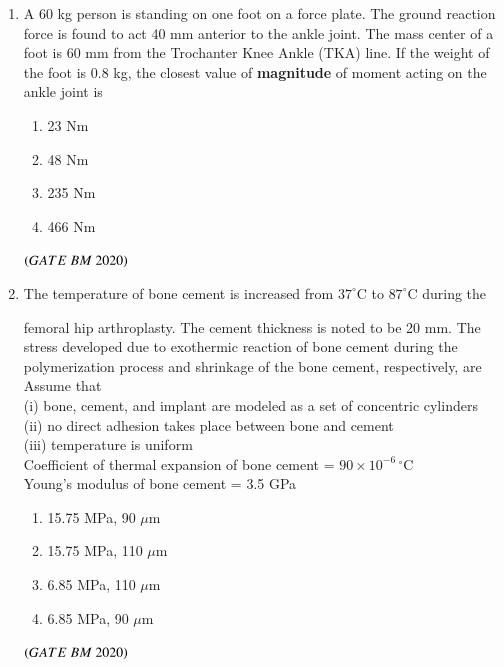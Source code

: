\documentclass[journal,12pt,onecolumn]{IEEEtran}
\theoremstyle{remark}
\begin{document}
\begin{enumerate}
\item A 60 kg person is standing on one foot on a force plate. The ground reaction
force is found to act 40 mm anterior to the ankle joint. The mass center of a foot
is 60 mm from the Trochanter Knee Ankle (TKA) line. If the weight of the foot
is 0.8 kg, the closest value of \textbf{magnitude} of moment acting on the ankle joint is
\begin{enumerate}[label=\alph*)] 
\item\hspace{0.5cm}23 Nm
\item\hspace{0.5cm}48 Nm
\item\hspace{0.5cm}235 Nm
\item\hspace{0.5cm}466 Nm
\end{enumerate}
 \hfill $\left(GATE\ BM\ 2020\right)$\\
 
\item The temperature of bone cement is increased from $37^\circ\mathrm{C}$ to $87^\circ\mathrm{C}$ during the

femoral hip arthroplasty. The cement thickness is noted to be 20 mm. The stress
developed due to exothermic reaction of bone cement during the polymerization
process and shrinkage of the bone cement, respectively, are\\

Assume that\\

(i) bone, cement, and implant are modeled as a set of concentric cylinders\\

(ii) no direct adhesion takes place between bone and cement\\

(iii) temperature is uniform\\

Coefficient of thermal expansion of bone cement = $90 \times 10^{-6}\,^\circ\mathrm{C}$\\
Young's modulus of bone cement = 3.5 GPa

\begin{enumerate}[label=\alph*)] 
\item\hspace{0.5cm}15.75 MPa, 90 $\mu$m
\item\hspace{0.5cm}15.75 MPa, 110 $\mu$m
\item\hspace{0.5cm}6.85 MPa, 110 $\mu$m
\item\hspace{0.5cm}6.85 MPa, 90 $\mu$m
 \end{enumerate}
 \hfill $\left(GATE\ BM\ 2020\right)$\\
 

\end{enumerate}
\end{document}
